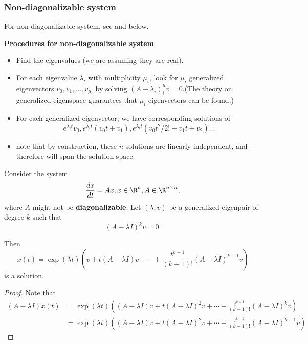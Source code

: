\begin{refsection}
\subsubsection{Non-diagonalizable system}








\begin{remark}
	For non-diagonalizable system, see \cite[148]{luenberger1979introduction} and below.
\end{remark}
\begin{note}
	\textbf{Procedures for non-diagonalizable system}\\
	\begin{itemize}
		\item Find the eigenvalues (we are assuming they are real).
		\item For each eigenvalue $\lambda_i$ with multiplicity $\mu_i$, look for $\mu_i$ generalized eigenvectors $v_0,v_1,...,v_{\mu_i}$ by solving $(A-\lambda_i)^\mu_i v = 0$.(The theory on generalized eigenspace guarantees that $\mu_i$ eigenvectors can be found.)
		\item For each generalized eigenvector, we have corresponding solutions of
		$$e^{\lambda_i t}v_0,e^{\lambda_i t}(v_0 t + v_1), e^{\lambda_i t}(v_0 t^2/2! + v_1 t + v_2)...$$
		\item note that by construction, these $n$ solutions are linearly independent, and therefore will span the solution space.
	\end{itemize}
\end{note}

\begin{theorem}\label{ch:dynamical-systems:th:generalizedEigenpairSoluitontoLinearSystems}
Consider the system
$$\frac{dx}{dt} = Ax, x\in \R^n, A\in \R^{n\times n},$$
where $A$ might not be \textbf{diagonalizable}. Let $(\lambda, v)$ be a generalized eigenpair of degree $k$ such that
$$(A - \lambda I)^k v = 0.$$

Then $$x(t) = \exp(\lambda t)(v + t(A-\lambda I)v + \cdots + \frac{t^{k-1}}{(k-1)!}(A-\lambda I)^{k-1}v)$$
is a solution.
\end{theorem}
\begin{proof}
Note that
\begin{align*}
(A-\lambda I)x(t) &=\exp(\lambda t)((A-\lambda I)v + t(A-\lambda I)^2v + \cdots + \frac{t^{k-1}}{(k-1)!}(A-\lambda I)^{k}v) \\
&=\exp(\lambda t)((A-\lambda I)v + t(A-\lambda I)^2v + \cdots + \frac{t^{k-2}}{(k-1)!}(A-\lambda I)^{k-1}v) 
\end{align*}


\end{proof}
\end{refsection}
